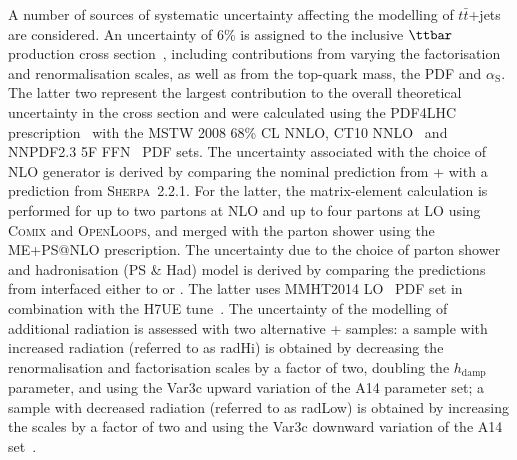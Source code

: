 A number of sources of systematic uncertainty affecting the modelling of $t\bar{t}$+jets are considered. 
An uncertainty of  6\% is assigned to the inclusive $\ttbar$ production
cross section~\cite{Czakon:2011xx}, including contributions from varying the factorisation and renormalisation 
scales, as well as from the top-quark mass, the PDF and $\alpha_{\textrm{S}}$. The latter two represent the largest contribution 
to the overall theoretical uncertainty in the cross section and were calculated using the PDF4LHC prescription~\cite{Botje:2011sn} 
with the MSTW 2008 68\% CL NNLO, CT10 NNLO~\cite{Lai:2010vv,Gao:2013xoa} and NNPDF2.3 5F FFN~\cite{Ball:2012cx} PDF sets.
The uncertainty associated with the choice of NLO generator is derived by comparing the nominal prediction from
{\powheg}+{\pythiaeight} with a prediction from \textsc{Sherpa}~2.2.1. For the latter, the matrix-element calculation is performed 
for up to two partons at NLO and up to four partons at LO using \textsc{Comix} and \textsc{OpenLoops}, and
merged with the {\sherpa} parton shower using the ME+PS@NLO prescription.
The uncertainty due to the choice of parton shower and hadronisation (PS \& Had) model is derived 
by comparing the predictions from {\powheg} interfaced either to {\pythiaeight} or {}. 
The latter uses MMHT2014 LO~\cite{Harland-Lang:2014zoa} PDF set in combination with the H7UE tune~\cite{Bellm:2015jjp}.
The uncertainty of the modelling of additional radiation is assessed with two alternative {\powheg}+{\pythiaeight} samples:
a sample with increased radiation (referred to as radHi) is obtained by decreasing the renormalisation and factorisation scales  
by a factor of two, doubling the $h_{\textrm{damp}}$ parameter, and using the Var3c upward variation of the A14 parameter set;
a sample with decreased radiation (referred to as radLow) is obtained by increasing the scales by a factor of two 
and using the Var3c downward variation of the A14 set~\cite{ATL-PHYS-PUB-2016-004}.

